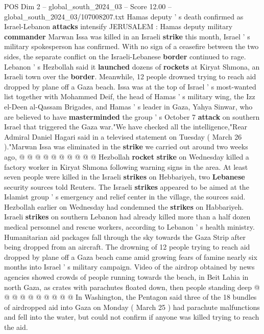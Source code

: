 \begin{textsample}{POS Dim 2 – global\_south\_2024\_03 – Score 12.00 – global\_south\_2024\_03/107008207.txt}  \label{ex:f2_pos_339}
Hamas deputy ' s death confirmed as Israel-Lebanon \textbf{attacks} intensify JERUSALEM : Hamas deputy military \textbf{commander} Marwan Issa was killed in an Israeli \textbf{strike} this month, Israel ' s military spokesperson has confirmed.
With no sign of a ceasefire between the two sides, the separate conflict on the Israeli-Lebanese \textbf{border} continued to rage.
Lebanon ' s Hezbollah said it \textbf{launched} dozens of \textbf{rockets} at Kiryat Shmona, an Israeli town over the \textbf{border}.
Meanwhile, 12 people drowned trying to reach aid dropped by plane off a Gaza beach.
Issa was at the top of Israel ' s most-wanted list together with Mohammed Deif, the head of Hamas ' s military wing, the Izz el-Deen al-Qassam Brigades, and Hamas ' s leader in Gaza, Yahya Sinwar, who are believed to have \textbf{masterminded} the group ' s October 7 \textbf{attack} on southern Israel that triggered the Gaza war."We have checked all the intelligence,"Rear Admiral Daniel Hagari said in a televised statement on Tuesday ( March 26 )."Marwan Issa was eliminated in the \textbf{strike} we carried out around two weeks ago, @ @ @ @ @ @ @ @ @ @ Hezbollah \textbf{rocket} \textbf{strike} on Wednesday killed a factory worker in Kiryat Shmona following warning signs in the area.
At least seven people were killed in the Israeli \textbf{strikes} on Hebbariyeh, two \textbf{Lebanese} security sources told Reuters.
The Israeli \textbf{strikes} appeared to be aimed at the Islamist group ' s emergency and relief center in the village, the sources said.
Hezbollah earlier on Wednesday had condemned the \textbf{strikes} on Habbariyeh.
Israeli \textbf{strikes} on southern Lebanon had already killed more than a half dozen medical personnel and rescue workers, according to Lebanon ' s health ministry.
Humanitarian aid packages fall through the sky towards the Gaza Strip after being dropped from an aircraft.
The drowning of 12 people trying to reach aid dropped by plane off a Gaza beach came amid growing fears of famine nearly six months into Israel ' s military campaign.
Video of the airdrop obtained by news agencies showed crowds of people running towards the beach, in Beit Lahia in north Gaza, as crates with parachutes floated down, then people standing deep @ @ @ @ @ @ @ @ @ @ In Washington, the Pentagon said three of the 18 bundles of airdropped aid into Gaza on Monday ( March 25 ) had parachute malfunctions and fell into the water, but could not confirm if anyone was killed trying to reach the aid.

\end{textsample}
